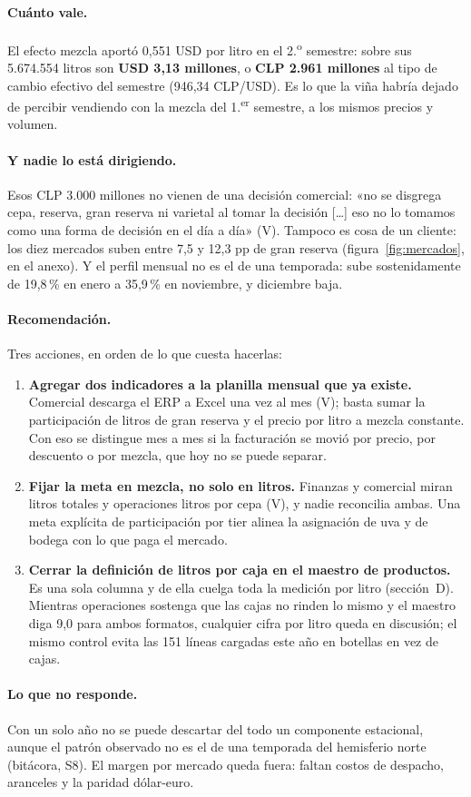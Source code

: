 \paragraph{Cuánto vale.} El efecto mezcla aportó 0,551 USD por litro en el 2.\textsuperscript{o} semestre: sobre sus 5.674.554 litros son \textbf{USD 3,13 millones}, o \textbf{CLP 2.961 millones} al tipo de cambio efectivo del semestre (946,34 CLP/USD). Es lo que la viña habría dejado de percibir vendiendo con la mezcla del 1.\textsuperscript{er} semestre, a los mismos precios y volumen.

\paragraph{Y nadie lo está dirigiendo.} Esos CLP 3.000 millones no vienen de una decisión comercial: «no se disgrega cepa, reserva, gran reserva ni varietal al tomar la decisión [\ldots] eso no lo tomamos como una forma de decisión en el día a día» (V). Tampoco es cosa de un cliente: los diez mercados suben entre 7,5 y 12,3 pp de gran reserva (figura~\ref{fig:mercados}, en el anexo). Y el perfil mensual no es el de una temporada: sube sostenidamente de 19,8\,\% en enero a 35,9\,\% en noviembre, y diciembre baja.

\paragraph{Recomendación.} Tres acciones, en orden de lo que cuesta hacerlas:

\begin{enumerate}
\item \textbf{Agregar dos indicadores a la planilla mensual que ya existe.} Comercial descarga el ERP a Excel una vez al mes (V); basta sumar la participación de litros de gran reserva y el precio por litro a mezcla constante. Con eso se distingue mes a mes si la facturación se movió por precio, por descuento o por mezcla, que hoy no se puede separar.
\item \textbf{Fijar la meta en mezcla, no solo en litros.} Finanzas y comercial miran litros totales y operaciones litros por cepa (V), y nadie reconcilia ambas. Una meta explícita de participación por tier alinea la asignación de uva y de bodega con lo que paga el mercado.
\item \textbf{Cerrar la definición de litros por caja en el maestro de productos.} Es una sola columna y de ella cuelga toda la medición por litro (sección~D). Mientras operaciones sostenga que las cajas no rinden lo mismo y el maestro diga 9,0 para ambos formatos, cualquier cifra por litro queda en discusión; el mismo control evita las 151 líneas cargadas este año en botellas en vez de cajas.
\end{enumerate}

\paragraph{Lo que no responde.} Con un solo año no se puede descartar del todo un componente estacional, aunque el patrón observado no es el de una temporada del hemisferio norte (bitácora, S8). El margen por mercado queda fuera: faltan costos de despacho, aranceles y la paridad dólar-euro.
